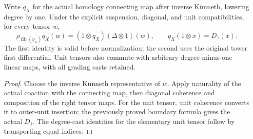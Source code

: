 \begin{proposition}
  \label{prop:h6-tensor-boundary-comodule}
  \leanok
  Write $q_X$ for the actual homology connecting map after inverse
  K\"unneth, lowering degree by one. Under the explicit suspension,
  diagonal, and unit compatibilities, for every tensor $w$,
  \[
    \rho_{\operatorname{fib}(\eta_X)}q_X(w)
      =(1\otimes q_X)(\Delta\otimes1)(w),
    \qquad q_X(1\otimes x)=D_1(x).
  \]
  The first identity is valid before normalization; the second uses the
  original tower first differential. Unit tensors also commute with
  arbitrary degree-minus-one linear maps, with all grading casts retained.
\end{proposition}
\begin{proof}
  Choose the inverse K\"unneth representative of $w$. Apply naturality of
  the actual coaction with the connecting map, then diagonal coherence
  and composition of the right tensor maps. For the unit tensor, unit
  coherence converts it to outer-unit insertion; the previously proved
  boundary formula gives the actual $D_1$. The degree-cast identities
  for the elementary unit tensor follow by transporting equal indices.
  \leanok
\end{proof}


